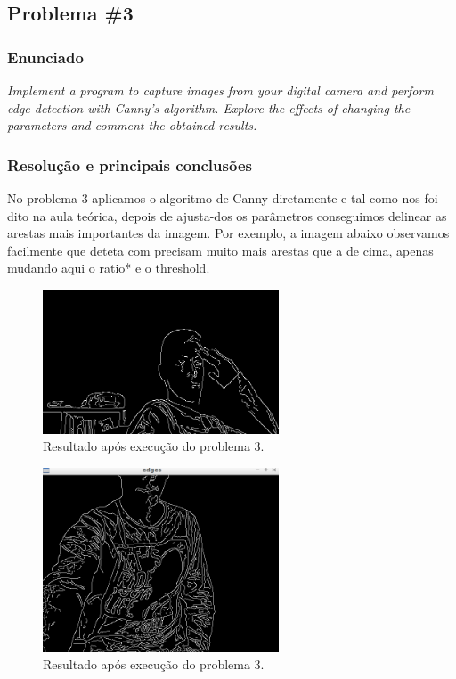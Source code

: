 \documentclass[portuguese, times, mirror]{revdetua}
\begin{document}




\subsection{Problema \#3}

\subsubsection{Enunciado}
\textit{ Implement a program to capture images from your digital camera and perform edge detection with
Canny’s algorithm. Explore the effects of changing the parameters and comment the obtained
results.}

\subsubsection{Resolução e principais conclusões}

No problema 3 aplicamos o algoritmo de Canny diretamente e tal como nos foi dito na aula teórica, depois de ajusta-dos os parâmetros conseguimos delinear as arestas mais importantes da imagem. Por exemplo, a imagem abaixo observamos facilmente que deteta com precisam muito mais arestas que a de cima, apenas mudando aqui o ratio* e o threshold.


\begin{figure}[ht!]
\centering
\includegraphics[width=70mm]{img/ex3.png}
\caption{Resultado após execução do problema 3.}
\end{figure}

\begin{figure}[ht!]
\centering
\includegraphics[width=70mm]{img/ex3better.png}
\caption{Resultado após execução do problema 3.}
\end{figure}
\end{document}
